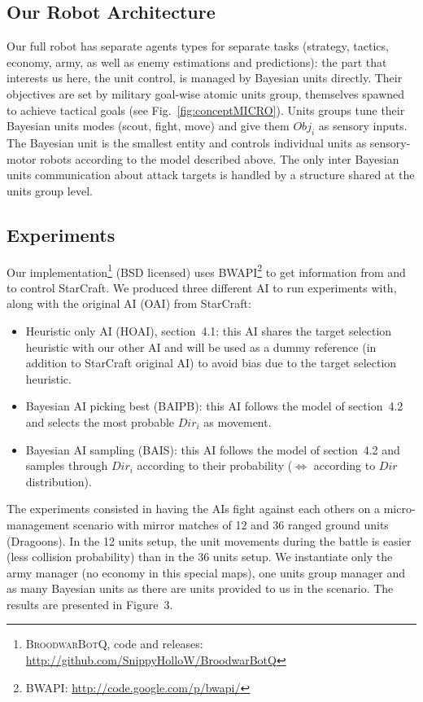 \subsection{Our Robot Architecture}

Our full robot has separate agents types for separate tasks (strategy, tactics, economy, army, as well as enemy estimations and predictions): the part that interests us here, the unit control, is managed by Bayesian units directly. Their objectives are set by military goal-wise atomic units group, themselves spawned to achieve tactical goals (see Fig.~\ref{fig:conceptMICRO}). Units groups tune their Bayesian units modes (scout, fight, move) and give them $Obj_i$ as sensory inputs. The Bayesian unit is the smallest entity and controls individual units as sensory-motor robots according to the model described above. The only inter Bayesian units communication about attack targets is handled by a structure shared at the units group level.

\subsection{Experiments}

Our implementation\footnote{\textsc{BroodwarBotQ}, code and releases: \url{http://github.com/SnippyHolloW/BroodwarBotQ}} (BSD licensed) uses BWAPI\footnote{BWAPI: \url{http://code.google.com/p/bwapi/}} to get information from and to control StarCraft. 
We produced three different AI to run experiments with, along with the original AI (OAI) from StarCraft:
\begin{itemize}
\item Heuristic only AI (HOAI), section~4.1: this AI shares the target selection heuristic with our other AI and will be used as a dummy reference (in addition to StarCraft original AI) to avoid bias due to the target selection heuristic.
\item Bayesian AI picking best (BAIPB): this AI follows the model of section~4.2 and selects the most probable $Dir_i$ as movement. 
\item Bayesian AI sampling (BAIS): this AI follows the model of section~4.2 and samples through $Dir_i$ according to their probability ($\Leftrightarrow$ according to $Dir$ distribution).
\end{itemize}

The experiments consisted in having the AIs fight against each others on a micro-management scenario with mirror matches of 12 and 36 ranged ground units (Dragoons). In the 12 units setup, the unit movements during the battle is easier (less collision probability) than in the 36 units setup. We instantiate only the army manager (no economy in this special maps), one units group manager and as many Bayesian units as there are units provided to us in the scenario. The results are presented in Figure~3.

